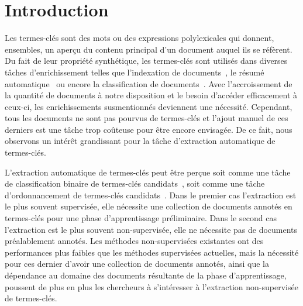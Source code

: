 \section{Introduction}
\label{sec:introduction}
  Les termes-clés sont des mots ou des expressions polylexicales qui donnent,
  ensembles, un aperçu du contenu principal d'un document auquel ils se
  réfèrent.
  Du fait de leur propriété synthétique, les termes-clés sont utilisés dans
  diverses tâches d'enrichissement telles que l'indexation de
  documents~\cite{medelyan2008smalltrainingset}, le résumé
  automatique~\cite{litvak2008graphbased} ou encore la classification de
  documents~\cite{han2007webdocumentclustering}. Avec l'accroissement de la
  quantité de documents à notre disposition et le besoin d'accéder efficacement
  à ceux-ci, les enrichissements susmentionnés deviennent une nécessité.
  Cependant, tous les documents ne sont pas pourvus de termes-clés et l'ajout
  manuel de ces derniers est une tâche trop coûteuse pour être encore envisagée.
  De ce fait, nous observons un intérêt grandissant pour la tâche d'extraction
  automatique de termes-clés.

  L'extraction automatique de termes-clés peut être perçue soit comme une tâche
  de classification binaire de termes-clés candidats~\cite{witten1999kea}, soit
  comme une tâche d'ordonnancement de termes-clés
  candidats~\cite{mihalcea2004textrank}. Dans le premier cas l'extraction est le
  plus souvent supervisée, elle nécessite une collection de documents annotés en
  termes-clés pour une phase d'apprentissage préliminaire. Dans le second cas
  l'extraction est le plus souvent non-supervisée, elle ne nécessite pas de
  documents préalablement annotés. Les méthodes non-supervisées existantes ont
  des performances plus faibles que les méthodes supervisées actuelles, mais la
  nécessité pour ces dernier d'avoir une collection de documents annotés, ainsi
  que la dépendance au domaine des documents résultante de la phase
  d'apprentissage, poussent de plus en plus les chercheurs à s'intéresser à
  l'extraction non-supervisée de termes-clés.

